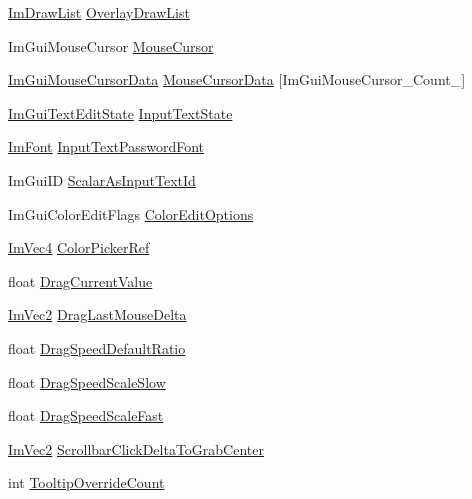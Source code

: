 \begin{DoxyCompactItemize}
\item 
\hyperlink{struct_im_draw_list}{Im\+Draw\+List} \hyperlink{struct_im_gui_context_abc8e0592d9beea307d78661df0a38b1a}{Overlay\+Draw\+List}
\item 
Im\+Gui\+Mouse\+Cursor \hyperlink{struct_im_gui_context_ab60730c7f9f601fd0b22dac060a822e3}{Mouse\+Cursor}
\item 
\hyperlink{struct_im_gui_mouse_cursor_data}{Im\+Gui\+Mouse\+Cursor\+Data} \hyperlink{struct_im_gui_context_a244c1b68fdb7da04de90d5becd5a5777}{Mouse\+Cursor\+Data} \mbox{[}Im\+Gui\+Mouse\+Cursor\+\_\+\+Count\+\_\+\mbox{]}
\item 
\hyperlink{struct_im_gui_text_edit_state}{Im\+Gui\+Text\+Edit\+State} \hyperlink{struct_im_gui_context_ae8626ef18bc5a848691a0c50e2c0f7ae}{Input\+Text\+State}
\item 
\hyperlink{struct_im_font}{Im\+Font} \hyperlink{struct_im_gui_context_a6aa67b9b778bd741d9866ec34cc8ee8b}{Input\+Text\+Password\+Font}
\item 
Im\+Gui\+ID \hyperlink{struct_im_gui_context_af7d6712f53762d620c4d4dac89dbc222}{Scalar\+As\+Input\+Text\+Id}
\item 
Im\+Gui\+Color\+Edit\+Flags \hyperlink{struct_im_gui_context_a122394766b40cdb6cbd8a40fbe6ac680}{Color\+Edit\+Options}
\item 
\hyperlink{struct_im_vec4}{Im\+Vec4} \hyperlink{struct_im_gui_context_ae3a119a9a71b31ede7ccc87447627b68}{Color\+Picker\+Ref}
\item 
float \hyperlink{struct_im_gui_context_a96ed5993aaddb183dc36244912ea261f}{Drag\+Current\+Value}
\item 
\hyperlink{struct_im_vec2}{Im\+Vec2} \hyperlink{struct_im_gui_context_a804ee75ff62a35d2955ecf7917e704f9}{Drag\+Last\+Mouse\+Delta}
\item 
float \hyperlink{struct_im_gui_context_aea2d961c03a1d0879088385d8cf602dd}{Drag\+Speed\+Default\+Ratio}
\item 
float \hyperlink{struct_im_gui_context_a69df3a201fa28cf99b6a442d506806a0}{Drag\+Speed\+Scale\+Slow}
\item 
float \hyperlink{struct_im_gui_context_ac12072b2fbfca44e4d8b9775cb8cfa21}{Drag\+Speed\+Scale\+Fast}
\item 
\hyperlink{struct_im_vec2}{Im\+Vec2} \hyperlink{struct_im_gui_context_a07456ba31300e2ee1cb1827dfbd02fe6}{Scrollbar\+Click\+Delta\+To\+Grab\+Center}
\item 
int \hyperlink{struct_im_gui_context_a1c6e3c1b866fa1abf473d3cd9eafce0f}{Tooltip\+Override\+Count}
\item 

\end{DoxyCompactItemize}
